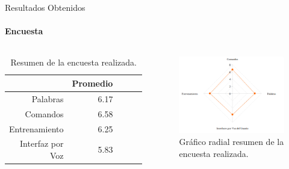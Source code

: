 \begin{frame}{Resultados Obtenidos}
\framesubtitle{Encuesta}
\begin{columns}
\begin{table}[H] 
\centering
\tiny
\begin{tabular}{|r|r|r|r|r|}
\hline
            & Promedio \\
\hline
Palabras    & 6.17 \\
Comandos    & 6.58 \\
Entrenamiento  & 6.25 \\
Interfaz por Voz & 5.83 \\
\hline
\end{tabular}
\caption{Resumen de la encuesta realizada.}
\label{sec:tabla-encuesta}
\end{table}
\begin{figure}[ht]
\centering
\includegraphics[width=1\linewidth]{./graphics/kiviat0.png}
\caption{Gr\'afico radial resumen de la encuesta realizada.}
\label{figure:kiviat-encuesta1}
\end{figure}
\end{columns}
\end{frame}

